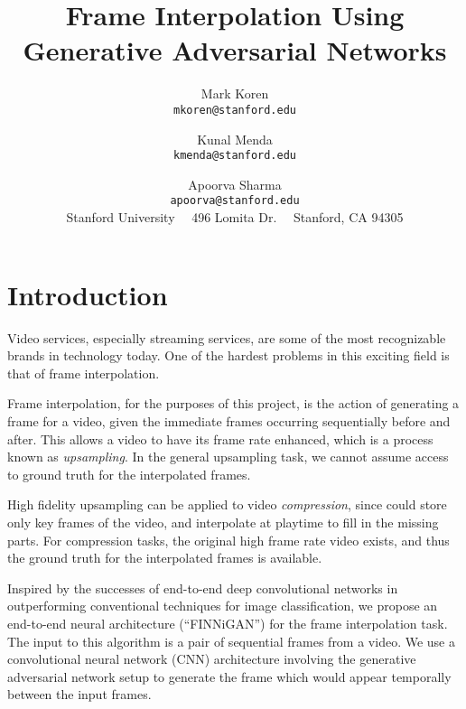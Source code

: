 \documentclass[10pt,twocolumn,letterpaper]{article}
\begin{document}
\title{Frame Interpolation Using Generative Adversarial Networks}

\author{Mark Koren\\
{\tt\small mkoren@stanford.edu}
\and
Kunal Menda\\
{\tt\small kmenda@stanford.edu}
\and
Apoorva Sharma\\
{\tt\small apoorva@stanford.edu}\\
Stanford University
~~496 Lomita Dr.
~~Stanford, CA 94305
}


\maketitle



\section{Introduction}
Video services, especially streaming services, are some of the most recognizable brands in technology today. One of the hardest problems in this exciting field is that of frame interpolation.

Frame interpolation, for the purposes of this project, is the action of generating a frame for a video, given the immediate frames occurring sequentially before and after. This allows a video to have its frame rate enhanced, which is a process known as \textit{upsampling}. In the general upsampling task, we cannot assume access to ground truth for the interpolated frames.

High fidelity upsampling can be applied to video \textit{compression}, since could store only key frames of the video, and interpolate at playtime to fill in the missing parts. For compression tasks, the original high frame rate video exists, and thus the ground truth for the interpolated frames is available.

Inspired by the successes of end-to-end deep convolutional networks in outperforming conventional techniques for image classification, we propose an end-to-end neural architecture (``FINNiGAN'') for the frame interpolation task. The input to this algorithm is a pair of sequential frames from a video. We use a convolutional neural network (CNN) architecture involving the generative adversarial network setup to generate the frame which would appear temporally between the input frames.
\end{document}
